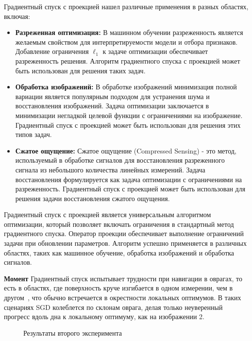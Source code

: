 Градиентный спуск с проекцией нашел различные применения
в разных областях, включая:

\begin{itemize}
\item \textbf{Разреженная оптимизация:}
В машинном обучении разреженность является желаемым
свойством для интерпретируемости модели и отбора признаков.
Добавление ограничения $\ell_1$ к задаче оптимизации
обеспечивает разреженность решения.
Алгоритм градиентного спуска с проекцией может
быть использован для решения таких задач.

\item \textbf{Обработка изображений:} В обработке изображений
минимизация полной вариации является популярным подходом
для устранения шума и восстановления изображений.
Задача оптимизации заключается в минимизации негладкой целевой
функции с ограничениями на изображение.
Градиентный спуск с проекцией может быть
использован для решения этих типов задач.

\item \textbf{Сжатое ощущение:} Сжатое ощущение
(Compressed Sensing) - это метод, используемый в обработке
сигналов для восстановления разреженного сигнала из
небольшого количества линейных измерений.
Задача восстановления формулируется как задача оптимизации
с ограничениями на разреженность.
Градиентный спуск с проекцией может быть использован для
решения задачи восстановления сжатого ощущения.
\end{itemize}

Градиентный спуск с проекцией является универсальным алгоритмом
оптимизации, который позволяет включать ограничения в
стандартный метод градиентного спуска.
Оператор проекции обеспечивает выполнение
ограничений задачи при обновлении параметров.
Алгоритм успешно применяется в различных областях, таких как
машинное обучение, обработка изображений и обработка сигналов.


\textbf{Момент}
Градиентный спуск испытывает трудности при навигации в оврагах,
то есть в областях, где поверхность круче изгибается в одном измерении,
чем в другом~\cite{Sutton1986},
что обычно встречается в окрестности локальных оптимумов.
В таких сценариях SGD колеблется по склонам оврага,
делая только неуверенный
прогресс вдоль дна к локальному оптимуму, как на изображении 2.

\begin{figure}[h!]
    \centering
    \caption{Результаты второго эксперимента}\label{fig:momentums}
\end{figure}

